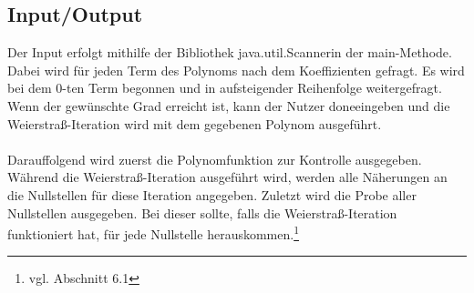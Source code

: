 \documentclass[12pt]{article}
\begin{document}
\subsection{Input/Output}
Der Input erfolgt mithilfe der Bibliothek \glqq java.util.Scanner\grqq\space in der \glqq main\grqq-Methode. Dabei wird für jeden Term des Polynoms nach dem Koeffizienten gefragt. Es wird bei dem $0$-ten Term begonnen und in aufsteigender Reihenfolge weitergefragt. Wenn der gewünschte Grad erreicht ist, kann der Nutzer \glqq done\grqq\space eingeben und die Weierstraß-Iteration wird mit dem gegebenen Polynom ausgeführt.\\
\\
Darauffolgend wird zuerst die Polynomfunktion zur Kontrolle ausgegeben. Während die Weierstraß-Iteration ausgeführt wird, werden alle Näherungen an die Nullstellen für diese Iteration angegeben. Zuletzt wird die Probe aller Nullstellen ausgegeben. Bei dieser sollte, falls die Weierstraß-Iteration funktioniert hat, \grqq\space für jede Nullstelle herauskommen.\footnote{
    vgl. Abschnitt 6.1
}
\end{document}
